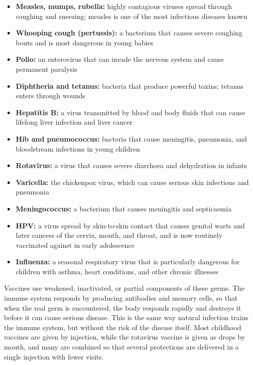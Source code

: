 \begin{itemize}
    \item \textbf{Measles, mumps, rubella:} highly contagious viruses spread through coughing and sneezing; measles is one of the most infectious diseases known
    \item \textbf{Whooping cough (pertussis):} a bacterium that causes severe coughing bouts and is most dangerous in young babies
    \item \textbf{Polio:} an enterovirus that can invade the nervous system and cause permanent paralysis
    \item \textbf{Diphtheria and tetanus:} bacteria that produce powerful toxins; tetanus enters through wounds
    \item \textbf{Hepatitis B:} a virus transmitted by blood and body fluids that can cause lifelong liver infection and liver cancer
    \item \textbf{Hib and pneumococcus:} bacteria that cause meningitis, pneumonia, and bloodstream infections in young children
    \item \textbf{Rotavirus:} a virus that causes severe diarrhoea and dehydration in infants
    \item \textbf{Varicella:} the chickenpox virus, which can cause serious skin infections and pneumonia
    \item \textbf{Meningococcus:} a bacterium that causes meningitis and septicaemia
    \item \textbf{HPV:} a virus spread by skin-to-skin contact that causes genital warts and later cancers of the cervix, mouth, and throat, and is now routinely vaccinated against in early adolescence
    \item \textbf{Influenza:} a seasonal respiratory virus that is particularly dangerous for children with asthma, heart conditions, and other chronic illnesses
\end{itemize}

Vaccines use weakened, inactivated, or partial components of these germs. The immune system responds by producing antibodies and memory cells, so that when the real germ is encountered, the body responds rapidly and destroys it before it can cause serious disease. This is the same way natural infection trains the immune system, but without the risk of the disease itself. Most childhood vaccines are given by injection, while the rotavirus vaccine is given as drops by mouth, and many are combined so that several protections are delivered in a single injection with fewer visits.


